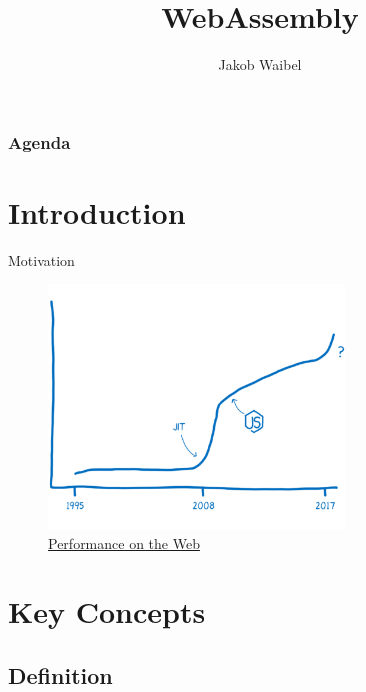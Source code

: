 \documentclass{beamer}
\title[WebAssembly]{WebAssembly}
\author{Jakob Waibel}
\institute[Jakob Waibel]{MI7 Druck und Medien}
\date
\begin{document}
\begin{frame}
    \titlepage
\end{frame}

\begin{frame}
    \frametitle{Agenda}
    \begin{multicols}{2}
    \tableofcontents
    \end{multicols}
\end{frame}

\section{Introduction}

\begin{frame}{Motivation}
    \begin{figure}
        \includegraphics[width=0.7\textwidth,height=0.7\textheight]{./images/perf_history.png}
        \caption{\href{https://hacks.mozilla.org/2017/02/a-cartoon-intro-to-webassembly/}{Performance on the Web}}
    \end{figure}
\end{frame}

\section{Key Concepts} 

\subsection{Definition}
\end{document}
